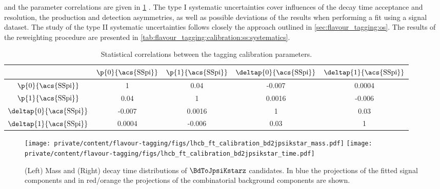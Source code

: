 \endgroup
%
and the parameter correlations are given in
\cref{tab:flavour_tagging:calibration:ss:correlations} \cite{Aaij:2015vza}. The
type I systematic uncertainties cover influences of the decay time acceptance
and resolution, the production and detection asymmetries, as well as possible
deviations of the results when performing a fit using a signal \sweighted
dataset. The study of the type II systematic uncertainties follows closely the
approach outlined in \cref{sec:flavour_tagging:os}. The results of the
reweighting procedure are presented in
\cref{tab:flavour_tagging:calibration:ss:systematics}.
%
\begin{table}
  \centering
  \caption{Statistical correlations between the \SSpi tagging calibration parameters. \cite{Aaij:2015vza}}
  \label{tab:flavour_tagging:calibration:ss:correlations}
  \begin{tabular}{ccccc}
    \toprule
    & $\p{0}{\text{\acs{SSpi}}}$ & $\p{1}{\text{\acs{SSpi}}}$ & $\deltap{0}{\text{\acs{SSpi}}}$ & $\deltap{1}{\text{\acs{SSpi}}}$ \\
    \midrule
    $\p{0}{\text{\acs{SSpi}}}$ & 1 & 0.04 & -0.007 & 0.0004 \\
    $\p{1}{\text{\acs{SSpi}}}$ & 0.04 & 1 & 0.0016 & -0.006 \\
    $\deltap{0}{\text{\acs{SSpi}}}$ & -0.007 & 0.0016 & 1 & 0.03 \\
    $\deltap{1}{\text{\acs{SSpi}}}$ & 0.0004 & -0.006 & 0.03 & 1 \\
    \bottomrule
  \end{tabular}
\end{table}
%
\begin{figure}[t]
  \texttt{[image: private/content/flavour-tagging/figs/lhcb\_ft\_calibration\_bd2jpsikstar\_mass.pdf]}
  \texttt{[image: private/content/flavour-tagging/figs/lhcb\_ft\_calibration\_bd2jpsikstar\_time.pdf]}
  \caption{(Left) Mass and (Right) decay time distributions of $\BdToJpsiKstarz$
  candidates. In blue the projections of the fitted signal components and in
  red/orange the projections of the combinatorial background components are
  shown. \cite{Aaij:2015vza}}
  \label{fig:flavour_tagging:calibration:ss:fit}
\end{figure}
%
